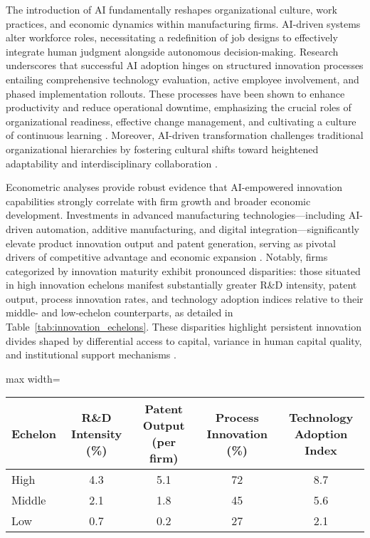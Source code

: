 \documentclass[sigconf]{acmart}
\begin{document}
The introduction of AI fundamentally reshapes organizational culture, work practices, and economic dynamics within manufacturing firms. AI-driven systems alter workforce roles, necessitating a redefinition of job designs to effectively integrate human judgment alongside autonomous decision-making. Research underscores that successful AI adoption hinges on structured innovation processes entailing comprehensive technology evaluation, active employee involvement, and phased implementation rollouts. These processes have been shown to enhance productivity and reduce operational downtime, emphasizing the crucial roles of organizational readiness, effective change management, and cultivating a culture of continuous learning \cite{ref19,ref28}. Moreover, AI-driven transformation challenges traditional organizational hierarchies by fostering cultural shifts toward heightened adaptability and interdisciplinary collaboration \cite{ref20,ref28}.

Econometric analyses provide robust evidence that AI-empowered innovation capabilities strongly correlate with firm growth and broader economic development. Investments in advanced manufacturing technologies—including AI-driven automation, additive manufacturing, and digital integration—significantly elevate product innovation output and patent generation, serving as pivotal drivers of competitive advantage and economic expansion \cite{ref21,ref20}. Notably, firms categorized by innovation maturity exhibit pronounced disparities: those situated in high innovation echelons manifest substantially greater R\&D intensity, patent output, process innovation rates, and technology adoption indices relative to their middle- and low-echelon counterparts, as detailed in Table~\ref{tab:innovation_echelons}. These disparities highlight persistent innovation divides shaped by differential access to capital, variance in human capital quality, and institutional support mechanisms \cite{ref21}.

\begin{table*}[htbp]
\centering
\caption{Innovation Activity Indicators Across Development Echelons in Manufacturing Industries \cite{ref21}}
\label{tab:innovation_echelons}
\begin{adjustbox}{max width=\textwidth}
\begin{tabular}{@{}lcccc@{}}
\toprule
Echelon & R\&D Intensity (\%) & Patent Output (per firm) & Process Innovation (\%) & Technology Adoption Index \\ \midrule
High & 4.3 & 5.1 & 72 & 8.7 \\
Middle & 2.1 & 1.8 & 45 & 5.6 \\
Low & 0.7 & 0.2 & 27 & 2.1 \\
\bottomrule
\end{tabular}
\end{adjustbox}
\end{table*}
\end{document}
